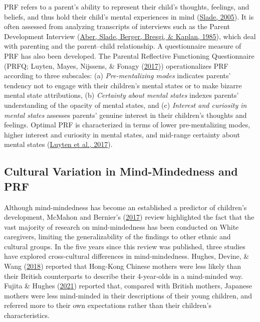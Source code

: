 \documentclass[
]{article}
\begin{document}
PRF refers to a parent's ability to represent their child's thoughts, feelings, and beliefs, and thus hold their child's mental experiences in mind (\protect\hyperlink{ref-Slade2005}{Slade, 2005}). It is often assessed from analyzing transcripts of interviews such as the Parent Development Interview (\protect\hyperlink{ref-Aber1985}{Aber, Slade, Berger, Bresgi, \& Kaplan, 1985}), which deal with parenting and the parent--child relationship. A questionnaire measure of PRF has also been developed. The Parental Reflective Functioning Questionnaire (PRFQ; Luyten, Mayes, Nijssens, \& Fonagy (\protect\hyperlink{ref-Luyten2017}{2017})) operationalizes PRF according to three subscales: (a) \emph{Pre-mentalizing modes} indicates parents' tendency not to engage with their children's mental states or to make bizarre mental state attributions, (b) \emph{Certainty about mental states} indexes parents' understanding of the opacity of mental states, and (c) \emph{Interest and curiosity in mental states} assesses parents' genuine interest in their children's thoughts and feelings. Optimal PRF is characterized in terms of lower pre-mentalizing modes, higher interest and curiosity in mental states, and mid-range certainty about mental states (\protect\hyperlink{ref-Luyten2017}{Luyten et al., 2017}).

\hypertarget{cultural-variation-in-mind-mindedness-and-prf}{%
\subsection*{Cultural Variation in Mind-Mindedness and PRF}\label{cultural-variation-in-mind-mindedness-and-prf}}

Although mind-mindedness has become an established a predictor of children's development, McMahon and Bernier's (\protect\hyperlink{ref-McMahon2017}{2017}) review highlighted the fact that the vast majority of research on mind-mindedness has been conducted on White caregivers, limiting the generalizability of the findings to other ethnic and cultural groups. In the five years since this review was published, three studies have explored cross-cultural differences in mind-mindedness. Hughes, Devine, \& Wang (\protect\hyperlink{ref-Hughes2018}{2018}) reported that Hong-Kong Chinese mothers were less likely than their British counterparts to describe their 4-year-olds in a mind-minded way. Fujita \& Hughes (\protect\hyperlink{ref-Fujita2021}{2021}) reported that, compared with British mothers, Japanese mothers were less mind-minded in their descriptions of their young children, and referred more to their own expectations rather than their children's characteristics.
\end{document}
